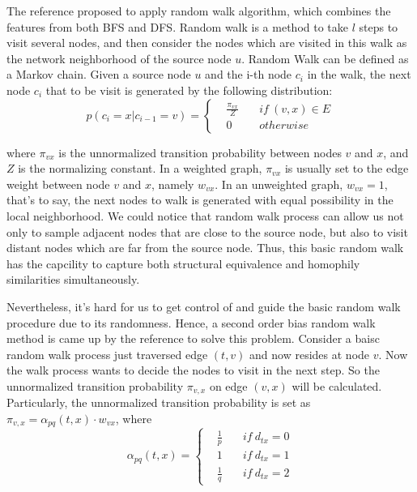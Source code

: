 \documentclass[sigconf]{acmart}
\begin{document}
The reference \cite{node2vec} proposed to apply random walk algorithm, which combines the features from both BFS and DFS. Random walk is a method to take $l$ steps to visit several nodes, and then consider the nodes which are visited in this walk as the network neighborhood of the source node $u$. Random Walk can be defined as a Markov chain. Given a source node $u$ and the i-th node $c_i$ in the walk, the next node $c_i$ that to be visit is generated by the following distribution: 
$$p(c_i=x|c_{i-1}=v)=\left\{
\begin{aligned}
&\frac{\pi_{vx}}{Z} \quad &if\ (v,x)\in E \\
&0 \quad &otherwise 
\end{aligned}
\right.$$

where $\pi_{vx}$ is the unnormalized transition probability between nodes $v$ and $x$, and $Z$ is the normalizing constant. In a weighted graph, $\pi_{vx}$ is usually set to the edge weight between node $v$ and $x$, namely $w_{vx}$. In an unweighted graph, $w_{vx}=1$, that's to say, the next nodes to walk is generated with equal possibility in the local neighborhood. We could notice that random walk process can  allow us not only to sample adjacent nodes that are close to the source node, but also to visit distant nodes which are far from the source node. Thus, this basic random walk has the capcility to capture both structural equivalence and homophily similarities simultaneously. 

Nevertheless, it's hard for us to get control of and guide the basic random walk procedure due to its randomness. Hence, a second order bias random walk method is came up by the reference \cite{node2vec} to solve this problem. Consider a baisc random walk process just traversed edge $(t,v)$ and now resides at node $v$. Now the walk process wants to decide the nodes to visit in the next step. So the unnormalized transition probability $\pi_{v,x}$ on edge $(v,x)$ will be calculated. Particularly, the unnormalized transition probability is set as $\pi_{v,x}=\alpha_{pq}(t,x)\cdot w_{vx}$, where
$$\alpha_{pq}(t,x)=\left\{
\begin{aligned}
& \frac{1}{p} \quad &if \ d_{tx}=0\\
&  1          \quad &if \ d_{tx}=1\\
& \frac{1}{q} \quad &if \ d_{tx}=2
\end{aligned}
\right.$$
\end{document}
